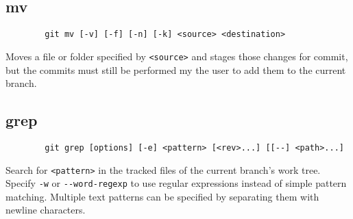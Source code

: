 \documentclass{article}
\begin{document}
    \subsection{mv}
      \begin{lstlisting} 
        git mv [-v] [-f] [-n] [-k] <source> <destination>\end{lstlisting} 
      Moves a file or folder specified by \verb|<source>| and stages those changes for commit, but the commits must still be performed my the user to add them to the current branch.\\
    \subsection{grep}
      \begin{lstlisting} 
        git grep [options] [-e] <pattern> [<rev>...] [[--] <path>...]\end{lstlisting} 
      Search for \verb|<pattern>| in the tracked files of the current branch's work tree. Specify \verb|-w| or \verb|--word-regexp| to use regular expressions instead of simple pattern matching. Multiple text patterns can be specified by separating them with newline characters. 
\end{document}
